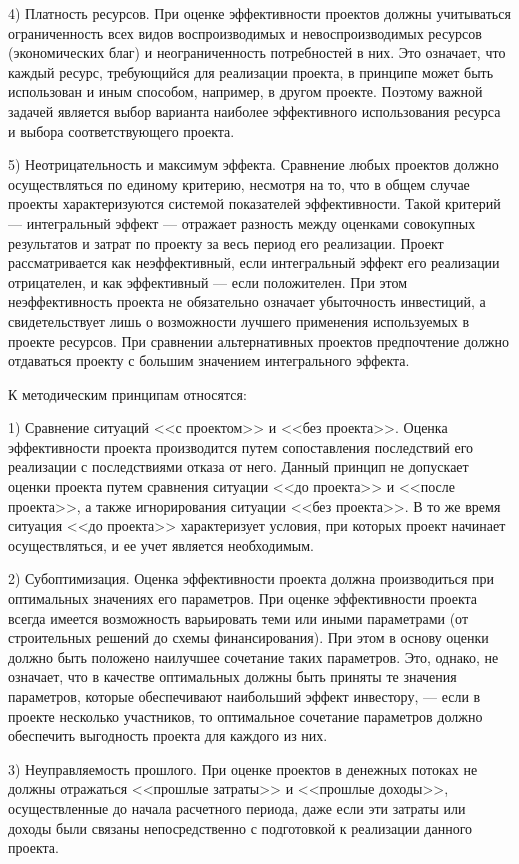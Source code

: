 4) Платность ресурсов.
При оценке эффективности проектов должны учитываться ограниченность всех видов воспроизводимых и невоспроизводимых ресурсов (экономических благ) и неограниченность потребностей в них.
Это означает, что каждый ресурс, требующийся для реализации проекта, в принципе может быть использован и иным способом, например, в другом проекте.
Поэтому важной задачей является выбор варианта наиболее эффективного использования ресурса и выбора соответствующего проекта.

5) Неотрицательность и максимум эффекта.
Сравнение любых проектов должно осуществляться по единому критерию, несмотря на то, что в общем случае проекты характеризуются системой показателей эффективности.
Такой критерий --- интегральный эффект --- отражает разность между оценками совокупных результатов и затрат по проекту за весь период его реализации.
Проект рассматривается как неэффективный, если интегральный эффект его реализации отрицателен, и как эффективный --- если положителен.
При этом неэффективность проекта не обязательно означает убыточность инвестиций, а свидетельствует лишь о возможности лучшего применения используемых в проекте ресурсов.
При сравнении альтернативных проектов предпочтение должно отдаваться проекту с большим значением интегрального эффекта.

К методическим принципам относятся:

1) Сравнение ситуаций <<с проектом>> и <<без проекта>>.
Оценка эффективности проекта производится путем сопоставления последствий его реализации с последствиями отказа от него.
Данный принцип не допускает оценки проекта путем сравнения ситуации <<до проекта>> и <<после проекта>>, а также игнорирования ситуации <<без проекта>>.
В то же время ситуация <<до проекта>> характеризует условия, при которых проект начинает осуществляться, и ее учет является необходимым.

2) Субоптимизация.
Оценка эффективности проекта должна производиться при оптимальных значениях его параметров.
При оценке эффективности проекта всегда имеется возможность варьировать теми или иными параметрами (от строительных решений до схемы финансирования).
При этом в основу оценки должно быть положено наилучшее сочетание таких параметров.
Это, однако, не означает, что в качестве оптимальных должны быть приняты те значения параметров, которые обеспечивают наибольший эффект инвестору, --- если в проекте несколько участников, то оптимальное сочетание параметров должно обеспечить выгодность проекта для каждого из них.

3) Неуправляемость прошлого.
При оценке проектов в денежных потоках не должны отражаться <<прошлые затраты>> и <<прошлые доходы>>, осуществленные до начала расчетного периода, даже если эти затраты или доходы были связаны непосредственно с подготовкой к реализации данного проекта.

